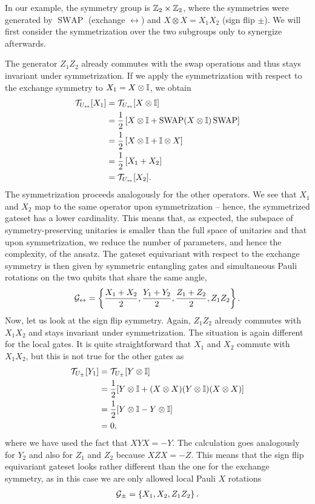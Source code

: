 \documentclass[a4paper,twocolumn,notitlepage,nofootinbib,superscriptaddress,floatfix]{revtex4-2}
\newcommand{\SWAP}{\ensuremath{\operatorname{SWAP}}}
\begin{document}
In our example, the symmetry group is $\mathbb{Z}_2 \times \mathbb{Z}_2$, where the symmetries were generated by $\SWAP$ (exchange $\leftrightarrow$) and $X \otimes X = X_1 X_2$ (sign flip $\pm$). We will first consider the symmetrization over the two subgroups only to synergize afterwards.

The generator $Z_1 Z_2$ already commutes with the swap operations and thus stays invariant under symmetrization. If we apply the symmetrization with respect to the exchange symmetry to $X_1 = X \otimes \mathbb{I}$, we obtain
\begin{align}
    \calT_{U_{\leftrightarrow}}[X_1] &= \calT_{U_{\leftrightarrow}}[X \otimes \bbI] \\
    &=\frac{1}{2}\left[X \otimes \bbI + \SWAP(X \otimes \bbI)\SWAP \right]\\
    &=\frac{1}{2}\left[X \otimes \bbI + \bbI \otimes X \right]\\
    &=\frac{1}{2}\left[X_1 + X_2 \right] \\
    &= \calT_{U_{\leftrightarrow}}[X_2].
\end{align}
The symmetrization proceeds analogously for the other operators. We see that $X_1$ and $X_2$ map to the same operator upon symmetrization -- hence, the symmetrized gateset has a lower cardinality. This means that, as expected, the subspace of symmetry-preserving unitaries is smaller than the full space of unitaries and that upon symmetrization, we reduce the number of parameters, and hence the complexity, of the ansatz. The gateset equivariant with respect to the exchange symmetry is then given by symmetric entangling gates and simultaneous Pauli rotations on the two qubits that share the same angle,
\begin{align}
    \mathcal{G}_{\leftrightarrow} = \left\{\frac{X_1 + X_2}{2}, \frac{Y_1 + Y_2}{2}, \frac{Z_1 + Z_2 }{2}, Z_1 Z_2 \right\}.
\end{align}
Now, let us look at the sign flip symmetry. Again, $Z_1 Z_2$ already commutes with $X_1 X_2$ and stays invariant under symmetrization. The situation is again different for the local gates. It is quite straightforward that $X_1$ and $X_2$ commute with $X_1 X_2$, but this is not true for the other gates as
\begin{align}
    \mathcal{T}_{U_{\pm}}[Y_1] &= \mathcal{T}_{U_{\pm}}[Y \otimes \mathbb{I}]  \\
    &= \frac{1}{2}[Y \otimes \mathbb{I} + (X\otimes X)(Y \otimes \mathbb{I})(X \otimes X)] \\
    &= \frac{1}{2}[Y \otimes \mathbb{I} - Y \otimes \mathbb{I}] \\
    &= 0,
\end{align}
where we have used the fact that $XYX = -Y$. The calculation goes analogously for $Y_2$ and also for $Z_1$ and $Z_2$ because $XZX = -Z$. This means that the sign flip equivariant gateset looks rather different than the one for the exchange symmetry, as in this case we are only allowed local Pauli $X$ rotations
\begin{align}
    \mathcal{G}_{\pm} = \left\{ X_1, X_2, Z_1 Z_2 \right\}.
\end{align}
\end{document}
